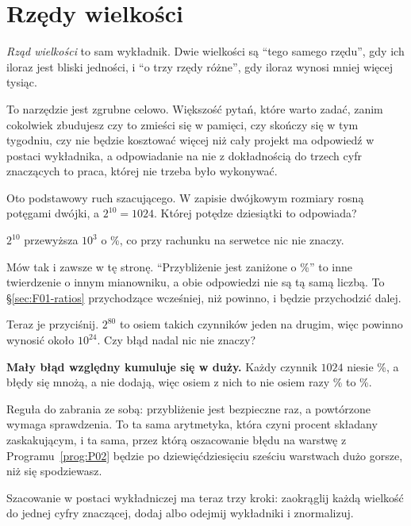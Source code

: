 \section{Rzędy wielkości}
\label{sec:F01-magnitudes}

\begin{fr}
\emph{Rząd wielkości} to sam wykładnik. Dwie wielkości są \enquote{tego samego
rzędu}, gdy ich iloraz jest bliski jedności, i \enquote{o trzy rzędy różne},
gdy iloraz wynosi mniej więcej tysiąc.

To narzędzie jest zgrubne celowo. Większość pytań, które warto zadać, zanim
cokolwiek zbudujesz \dash{} czy to zmieści się w pamięci, czy skończy się w tym
tygodniu, czy nie będzie kosztować więcej niż cały projekt \dash{} ma
odpowiedź w postaci wykładnika, a odpowiadanie na nie z dokładnością do trzech
cyfr znaczących to praca, której nie trzeba było wykonywać.

Oto podstawowy ruch szacującego. W zapisie dwójkowym rozmiary rosną potęgami
dwójki, a $2^{10} = 1024$. Której potędze dziesiątki to odpowiada?
\nextframe
\end{fr}

\begin{fr}
$2^{10}$ przewyższa $10^{3}$ o \%, co przy rachunku
na serwetce nic nie znaczy.

Mów tak i zawsze w tę stronę. \enquote{Przybliżenie jest zaniżone o
\%} to inne twierdzenie o innym mianowniku, a obie
odpowiedzi nie są tą samą liczbą. To \S\ref{sec:F01-ratios} przychodzące
wcześniej, niż powinno, i będzie przychodzić dalej.

Teraz je przyciśnij. $2^{80}$ to osiem takich czynników jeden na drugim, więc
powinno wynosić około $10^{24}$. Czy błąd nadal nic nie znaczy?
\nextframe
\end{fr}

\begin{fr}
\begin{trapbox}
\textbf{Mały błąd względny kumuluje się w duży.} Każdy czynnik $1024$ niesie
\%, a błędy się mnożą, a nie dodają, więc osiem z nich
to nie osiem razy \% \dash{} to
\%.

Reguła do zabrania ze sobą: przybliżenie jest bezpieczne raz, a powtórzone
wymaga sprawdzenia. To ta sama arytmetyka, która czyni procent składany
zaskakującym, i ta sama, przez którą oszacowanie błędu na warstwę z
Programu~\ref{prog:P02} będzie po dziewięćdziesięciu sześciu warstwach dużo
gorsze, niż się spodziewasz.
\end{trapbox}

Szacowanie w postaci wykładniczej ma teraz trzy kroki: zaokrąglij każdą
wielkość do jednej cyfry znaczącej, dodaj albo odejmij wykładniki i
znormalizuj.
\end{fr}

